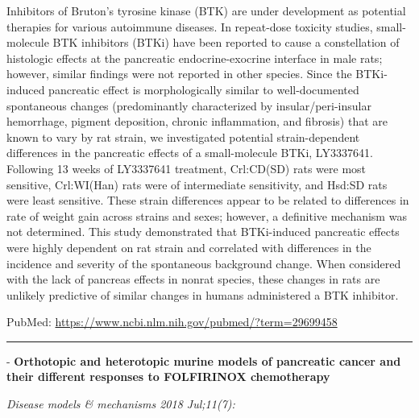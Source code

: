 \documentclass[]{article}
\begin{document}
Inhibitors of Bruton's tyrosine kinase (BTK) are under development as
potential therapies for various autoimmune diseases. In repeat-dose
toxicity studies, small-molecule BTK inhibitors (BTKi) have been
reported to cause a constellation of histologic effects at the
pancreatic endocrine-exocrine interface in male rats; however, similar
findings were not reported in other species. Since the BTKi-induced
pancreatic effect is morphologically similar to well-documented
spontaneous changes (predominantly characterized by insular/peri-insular
hemorrhage, pigment deposition, chronic inflammation, and fibrosis) that
are known to vary by rat strain, we investigated potential
strain-dependent differences in the pancreatic effects of a
small-molecule BTKi, LY3337641. Following 13 weeks of LY3337641
treatment, Crl:CD(SD) rats were most sensitive, Crl:WI(Han) rats were of
intermediate sensitivity, and Hsd:SD rats were least sensitive. These
strain differences appear to be related to differences in rate of weight
gain across strains and sexes; however, a definitive mechanism was not
determined. This study demonstrated that BTKi-induced pancreatic effects
were highly dependent on rat strain and correlated with differences in
the incidence and severity of the spontaneous background change. When
considered with the lack of pancreas effects in nonrat species, these
changes in rats are unlikely predictive of similar changes in humans
administered a BTK inhibitor.

PubMed: \url{https://www.ncbi.nlm.nih.gov/pubmed/?term=29699458}

{}

{}

\begin{center}\rule{0.5\linewidth}{\linethickness}\end{center}

 - \textbf{Orthotopic and heterotopic murine models of pancreatic cancer
and their different responses to FOLFIRINOX chemotherapy}

\emph{Disease models \& mechanisms 2018 Jul;11(7):}
\end{document}

